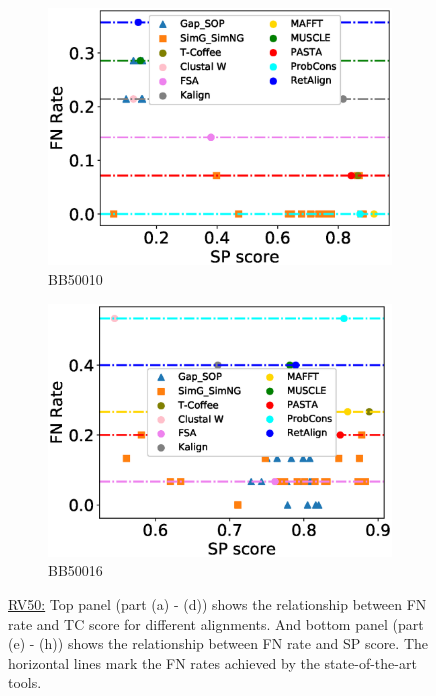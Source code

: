 \begin{figure}[!htbp]
\begin{adjustwidth}{-1cm}{-1cm}
\begin{subfigure}{0.22\textwidth}
			\includegraphics[width=\columnwidth]{Figure/summary/precomputedInit/Balibase/BB50010_fnrate_vs_sp_2}
			\caption{BB50010}
		\end{subfigure}
		\begin{subfigure}{0.22\textwidth}
			\includegraphics[width=\columnwidth]{Figure/summary/precomputedInit/Balibase/BB50016_fnrate_vs_sp_2}
			\caption{BB50016}
		\end{subfigure}	
		\end{adjustwidth}
		\caption[FN rate vs TC score on RV50]{\underline{RV50:} Top panel (part (a) - (d)) shows the relationship between FN rate and TC score for different alignments. And bottom panel (part (e) - (h)) shows the relationship between FN rate and SP score. The horizontal lines mark the FN rates achieved by the state-of-the-art tools.}
		\label{fig:rv50_fnrate_vs_tc}
\end{figure}

